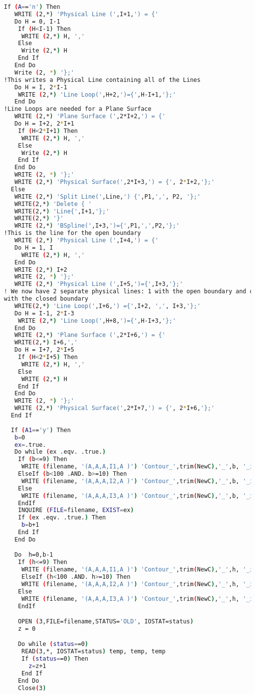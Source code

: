 \begin{lstlisting}[language = Bash]
  If (A=='n') Then
   WRITE (2,*) 'Physical Line (',I+1,') = {' 
   Do H = 0, I-1
    If (H<I-1) Then
     WRITE (2,*) H, ','
    Else
     Write (2,*) H
    End If
   End Do
   Write (2, *) '};'
!This writes a Physical Line containing all of the Lines
   Do H = I, 2*I-1
    WRITE (2,*) 'Line Loop(',H+2,')={',H-I+1,'};'
   End Do
!Line Loops are needed for a Plane Surface
   WRITE (2,*) 'Plane Surface (',2*I+2,') = {'
   Do H = I+2, 2*I+1
    If (H<2*I+1) Then
     WRITE (2,*) H, ','
    Else
     Write (2,*) H
    End If
   End Do
   WRITE (2, *) '};'
   WRITE (2,*) 'Physical Surface(',2*I+3,') = {', 2*I+2,'};'
  Else
   WRITE (2,*) 'Split Line(',Line,') {',P1,',', P2, '};'
   WRITE(2,*) 'Delete { '
   WRITE(2,*) 'Line{',I+1,'};'
   WRITE(2,*) '}'
   WRITE (2,*) 'BSpline(',I+3,')={',P1,',',P2,'};'
!This is the line for the open boundary
   WRITE (2,*) 'Physical Line (',I+4,') = {' 
   Do H = 1, I
     WRITE (2,*) H, ','
   End Do
   WRITE (2,*) I+2
   WRITE (2, *) '};'
   WRITE (2,*) 'Physical Line (',I+5,')={',I+3,'};'
! We now have 2 separate physical lines: 1 with the open boundary and one 
with the closed boundary
   WRITE(2,*) 'Line Loop(',I+6,') ={',I+2, ',', I+3,'};'
   Do H = I-1, 2*I-3
    WRITE (2,*) 'Line Loop(',H+8,')={',H-I+3,'};'
   End Do
   WRITE (2,*) 'Plane Surface (',2*I+6,') = {'
   WRITE(2,*) I+6,','
   Do H = I+7, 2*I+5
    If (H<2*I+5) Then
     WRITE (2,*) H, ','
    Else
     WRITE (2,*) H
    End If
   End Do
   WRITE (2, *) '};'
   WRITE (2,*) 'Physical Surface(',2*I+7,') = {', 2*I+6,'};'
  End If
 
  If (A1=='y') Then
   b=0
   ex=.true.
   Do while (ex .eqv. .true.)
    If (b<=9) Then
     WRITE (filename, '(A,A,A,I1,A )') 'Contour_',trim(NewC),'_',b, '_i.xyz'
    ElseIf (b<100 .AND. b>=10) Then
     WRITE (filename, '(A,A,A,I2,A )') 'Contour_',trim(NewC),'_',b, '_i.xyz'
    Else 
     WRITE (filename, '(A,A,A,I3,A )') 'Contour_',trim(NewC),'_',b, '_i.xyz'
    EndIf
    INQUIRE (FILE=filename, EXIST=ex)   
    If (ex .eqv. .true.) Then
     b=b+1
    End If
   End Do

   Do  h=0,b-1
    If (h<=9) Then
     WRITE (filename, '(A,A,A,I1,A )') 'Contour_',trim(NewC),'_',h, '_i.xyz'
     ElseIf (h<100 .AND. h>=10) Then
     WRITE (filename, '(A,A,A,I2,A )') 'Contour_',trim(NewC),'_',h, '_i.xyz'
    Else 
     WRITE (filename, '(A,A,A,I3,A )') 'Contour_',trim(NewC),'_',h, '_i.xyz'
    EndIf

    OPEN (3,FILE=filename,STATUS='OLD', IOSTAT=status)
    z = 0

    Do while (status==0)
     READ(3,*, IOSTAT=status) temp, temp, temp
     If (status==0) Then
       z=z+1
     End If
    End Do   
    Close(3)
   

\end{lstlisting}
